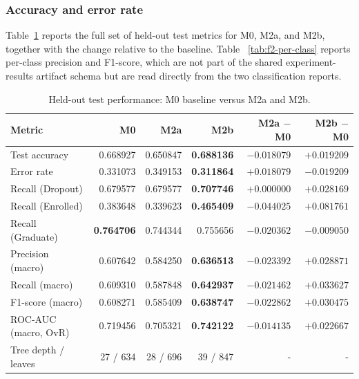 \subsubsection{Accuracy and error rate}
\label{sec:f2-results}

Table~\ref{tab:f2-main-metrics} reports the full set of held-out test metrics for
M0, M2a, and M2b, together with the change relative to the baseline. Table~
\ref{tab:f2-per-class} reports per-class precision and F1-score, which are not part
of the shared experiment-results artifact schema but are read directly from the two
classification reports.

\begin{table}[H]
\centering
\caption{Held-out test performance: M0 baseline versus M2a and M2b.}
\label{tab:f2-main-metrics}
\begin{tabular}{lrrrrr}
\toprule
\textbf{Metric} & \textbf{M0} & \textbf{M2a} & \textbf{M2b} & \textbf{M2a $-$ M0} & \textbf{M2b $-$ M0} \\
\midrule
Test accuracy        & 0.668927 & 0.650847 & \textbf{0.688136} & $-0.018079$ & \textbf{$+0.019209$} \\
Error rate            & 0.331073 & 0.349153 & \textbf{0.311864} & $+0.018079$ & \textbf{$-0.019209$} \\
Recall (Dropout)      & 0.679577 & 0.679577 & \textbf{0.707746} & $+0.000000$ & \textbf{$+0.028169$} \\
Recall (Enrolled)     & 0.383648 & 0.339623 & \textbf{0.465409} & $-0.044025$ & \textbf{$+0.081761$} \\
Recall (Graduate)     & \textbf{0.764706} & 0.744344 & 0.755656 & $-0.020362$ & $-0.009050$ \\
Precision (macro)     & 0.607642 & 0.584250 & \textbf{0.636513} & $-0.023392$ & \textbf{$+0.028871$} \\
Recall (macro)         & 0.609310 & 0.587848 & \textbf{0.642937} & $-0.021462$ & \textbf{$+0.033627$} \\
F1-score (macro)       & 0.608271 & 0.585409 & \textbf{0.638747} & $-0.022862$ & \textbf{$+0.030475$} \\
ROC-AUC (macro, OvR)   & 0.719456 & 0.705321 & \textbf{0.742122} & $-0.014135$ & \textbf{$+0.022667$} \\
Tree depth / leaves   & 27 / 634 & 28 / 696 & 39 / 847 & - & - \\
\bottomrule
\end{tabular}
\end{table}

